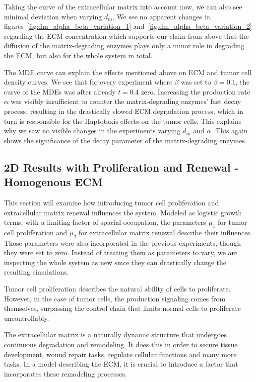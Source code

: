 Taking the curve of the extracellular matrix into account now, we can also see minimal deviation when varying $d_m$. We see no apparent changes in figures~\ref{fig:dm_alpha_beta_variation_1} and~\ref{fig:dm_alpha_beta_variation_2} regarding the ECM concentration which supports our claim from above that the diffusion of the matrix-degrading enzymes plays only a minor role in degrading the ECM, but also for the whole system in total.

The MDE curve can explain the effects mentioned above on ECM and tumor cell density curves. We see that for every experiment where $\beta$ was set to $\beta=0.1$, the curve of the MDEs was after already $t=0.4$ zero. Increasing the production rate $\alpha$ was visibly insufficient to counter the matrix-degrading enzymes' fast decay process, resulting in the drastically slowed ECM degradation process, which in turn is responsible for the Haptotaxis effects on the tumor cells. This explains why we saw no visible changes in the experiments varying $d_m$ and $\alpha$. This again shows the significance of the decay parameter of the matrix-degrading enzymes. 


\subsection{2D Results with Proliferation and Renewal - Homogenous ECM}
This section will examine how introducing tumor cell proliferation and extracellular matrix renewal influences the system. Modeled as logistic growth terms, with a limiting factor of spacial occupation, the parameters $\mu_1$ for tumor cell proliferation and $\mu_2$ for extracellular matrix renewal describe their influences. Those parameters were also incorporated in the previous experiments, though they were set to zero. Instead of treating them as parameters to vary, we are inspecting the whole system as new since they can drastically change the resulting simulations.

Tumor cell proliferation describes the natural ability of cells to proliferate. However, in the case of tumor cells, the production signaling comes from themselves, surpassing the control chain that limits normal cells to proliferate uncontrollably.

The extracellular matrix is a naturally dynamic structure that undergoes continuous degradation and remodeling. It does this in order to secure tissue development, wound repair tasks, regulate cellular functions and many more tasks. In a model describing the ECM, it is crucial to introduce a factor that incorporates these remodeling processes.

